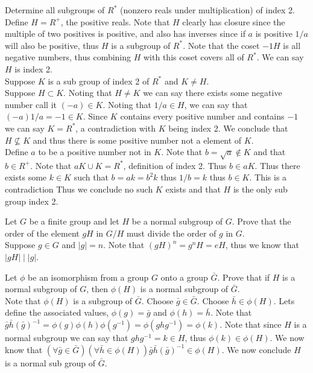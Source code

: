 \documentclass[12pt]{article}
\makeatletter
\theoremstyle{homework}
\newenvironment{exercise}[1]
{\def\@currentlabel{#1}\exercisecore}
{\endexercisecore}
\makeatother
\begin{document}
\begin{exercise}{9.36}
Determine all subgroups of $R^{*}$ (nonzero reals under multiplication) of index 2.\\
Define $H=R^+$, the positive reals.  Note that $H$ clearly has closure since the multiple of two positives is positive, and also has inverses since if $a$ is positive $1/a$ will also be positive, thus $H$ is a subgroup of $R^*$.  Note that the coset $-1H$ is all negative numbers, thus combining $H$ with this coset covers all of $R^*$.  We can say $H$ is index 2.\\
Suppose $K$ is a sub group of index 2 of $R^*$ and $K\neq H$.\\
Suppose $H\subset K$.  Noting that $H\neq K$ we can say there exists some negative number call it $(-a)\in K$.  Noting that $1/a\in H$, we can say that $(-a)1/a=-1\in K$.  Since $K$ contains every positive number and contains $-1$ we can say $K=R^*$, a contradiction with $K$ being index 2.  We conclude that $H\not\subseteq K$ and thus there is some positive number not a element of $K$.\\
Define $a$ to be a positive number not in $K$.  Note that $b=\sqrt{a}\not\in K$ and that $b\in R^+$.  Note that $aK\cup K=R^*$, definition of index 2.  Thus $b\in aK$.  Thus there exists some $k\in K$ such that $b=ak=b^2k$ thus $1/b=k$ thus $b\in K$.  This is a contradiction Thus we conclude no such $K$ exists and that $H$ is the only sub group index 2.
\end{exercise}

\begin{exercise}{9.37}
Let $G$ be a finite group and let $H$ be a normal subgroup of $G$.  Prove that the order of the element $gH$ in $G/H$ must divide the order of $g$ in $G$.\\
Suppose $g\in G$ and $|g|=n$.  Note that $(gH)^n=g^nH=eH$, thus we know that $|gH|\mid |g|$.
\end{exercise}

\begin{exercise}{9.40}
Let $\phi$ be an isomorphism from a group $G$ onto a group $\bar{G}$. Prove that if $H$ is a normal subgroup of $G$, then $\phi(H)$ is a normal subgroup of $\bar{G}$.\\
Note that $\phi(H)$ is a subgroup of $\bar{G}$.  Choose $\bar{g}\in\bar{G}$.  Choose $\bar{h}\in \phi(H)$.  Lets define the associated values, $\phi(g)=\bar{g}$ and $\phi(h)=\bar{h}$.  Note that $\bar{g}\bar{h}(\bar{g})^{-1}=\phi(g)\phi(h)\phi(g^{-1})=\phi(ghg^{-1})=\phi(k)$.  Note that since $H$ is a normal subgroup we can say that $ghg^{-1}=k\in H$, thus $\phi(k)\in\phi(H)$.  We now know that $(\forall \bar{g}\in\bar{G}) (\forall \bar{h}\in \phi(H)) \bar{g}\bar{h}(\bar{g})^{-1}\in \phi(H)$.  We now conclude $H$ is a normal sub group of $\bar{G}$.
\end{exercise}
\end{document}

